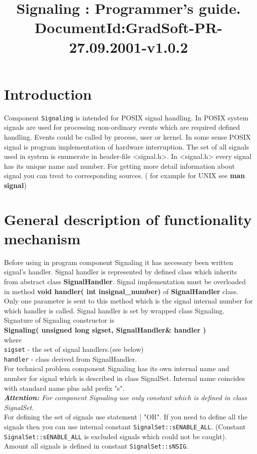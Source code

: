 \documentclass[12pt]{article}
\title{Signaling : Programmer's guide.
       \newline
       \small{DocumentId:GradSoft-PR-27.09.2001-v1.0.2}
      }
\begin{document}
\maketitle{}

\section{ Introduction }
   Component \verb|Signaling| is intended for POSIX signal handling. In POSIX 
system signals are used for processing non-ordinary events which are required
defined handling.
  Events could be called by process, user or kernel. In some sense POSIX 
signal is program implementation of hardware interruption. 
The set of all signals used in system is enumerate in header-file <signal.h>.
In <signal.h> every signal has its unique name and number. For getting more
detail information about signal you can treat to corresponding sources.
( for example for UNIX see {\bf man signal}) 

\section{ General description of functionality mechanism }
     Before using in program component Signaling  it has  
necessary been written signal's handler. Signal handler is represented by defined
class which inherits from abstract class {\bf SignalHandler}. 
Signal implementation must be overloaded in method {\bf void handler(
int insignal\_number) } of {\bf SignalHandler} class. Only one parameter is
sent to this method which is the signal internal number for which handler is
called. Signal handler is set by wrapped class Signaling. Signature of
Signaling constructor is \\
{\bf Signaling( unsigned long  sigset, SignalHandler\& handler )}\\
where \\
\verb|sigset| - the set of signal handlers.(see below)\\
\verb|handler| - class derived from SignalHandler.\\
For technical problem component Signaling has its own internal name and number
for signal which is described in class SignalSet. Internal name coincides with
standard name plus add prefix "{s}".\\
{\it
  {\bf Attention: } For component Signaling use only constant
   which is defined in class SignalSet.
}\\
For defining the set of signals use statement | {"OR"}. If you need to define
all the signals then you can use internal constant  
\verb|SignalSet::sENABLE_ALL|.
(Constant  \verb|SignalSet::sENABLE_ALL| is excluded  signals which 
could not be caught). Amount all signals is defined in constant 
\verb|SignalSet::sNSIG|.
\end{document}
